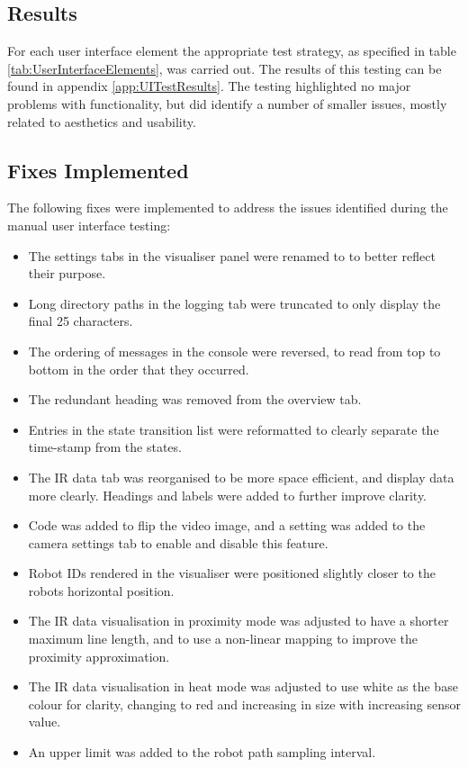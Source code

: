 \subsection{Results}
For each user interface element the appropriate test strategy, as specified in table \ref{tab:UserInterfaceElements}, was carried out. The results of this testing can be found in appendix \ref{app:UITestResults}. The testing highlighted no major problems with functionality, but did identify a number of smaller issues, mostly related to aesthetics and usability.

\subsection{Fixes Implemented}
The following fixes were implemented to address the issues identified during the manual user interface testing:

\begin{itemize}
 \item The settings tabs in the visualiser panel were renamed to to better reflect their purpose.
 \item Long directory paths in the logging tab were truncated to only display the final 25 characters.
 \item The ordering of messages in the console were reversed, to read from top to bottom in the order that they occurred.
 \item The redundant heading was removed from the overview tab.
 \item Entries in the state transition list were reformatted to clearly separate the time-stamp from the states.
 \item The IR data tab was reorganised to be more space efficient, and display data more clearly. Headings and labels were added to further improve clarity.
 \item Code was added to flip the video image, and a setting was added to the camera settings tab to enable and disable this feature.
 \item Robot IDs rendered in the visualiser were positioned slightly closer to the robots horizontal position.
 \item The IR data visualisation in proximity mode was adjusted to have a shorter maximum line length, and to use a non-linear mapping to improve the proximity approximation.
 \item The IR data visualisation in heat mode was adjusted to use white as the base colour for clarity, changing to red and increasing in size with increasing sensor value.
 \item An upper limit was added to the robot path sampling interval.
\end{itemize}

